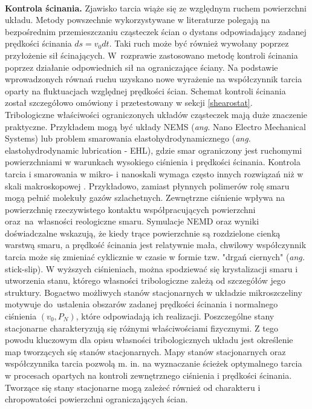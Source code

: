 \documentclass[12pt,a4paper,openright]{report} %
\begin{document}
\\
\textbf{Kontrola ścinania.} Zjawisko tarcia wiąże się ze względnym ruchem powierzchni układu. Metody powszechnie wykorzystywane w literaturze polegają na bezpośrednim przemieszczaniu cząsteczek ścian o dystans odpowiadający zadanej prędkości ścinania \linebreak $ds=v_0dt$. Taki ruch może być również wywołany poprzez przyłożenie sił ścinających. W~rozprawie zastosowano metodę kontroli ścinania poprzez działanie odpowiednich sił na ograniczające ściany. Na podstawie wprowadzonych równań ruchu uzyskano nowe wyrażenie na współczynnik tarcia oparty na fluktuacjach względnej prędkości ścian. Schemat kontroli ścinania został szczegółowo omówiony i przetestowany w sekcji \ref{shearostat}.\\
%
%

Tribologiczne właściwości ograniczonych układów cząsteczek mają duże znaczenie praktyczne. Przykładem mogą być układy NEMS (\textit{ang.} Nano Electro Mechanical Systems) lub problem smarowania elastohydrodynamicznego (\textit{ang.} elastohydrodynamic lubrication - EHL), gdzie smar ograniczony jest ruchomymi powierzchniami w warunkach wysokiego ciśnienia i prędkości ścinania. Kontrola tarcia i smarowania w mikro- i nanoskali wymaga często innych rozwiązań niż w skali makroskopowej \cite{SpringerHandbook}. Przykładowo, zamiast płynnych polimerów rolę smaru mogą pełnić molekuły gazów szlachetnych. Zewnętrzne ciśnienie wpływa na powierzchnię rzeczywistego kontaktu współpracujących powierzchni oraz~na~własności reologiczne smaru. Symulacje NEMD oraz wyniki doświadczalne wskazują, że kiedy trące powierzchnie są rozdzielone cienką warstwą smaru, a prędkość ścinania jest relatywnie mała, chwilowy współczynnik tarcia może się zmieniać cyklicznie w czasie w formie tzw. "drgań ciernych" (\textit{ang.} stick-slip). W wyższych ciśnieniach, można spodziewać się krystalizacji smaru i utworzenia stanu, którego własności tribologiczne zależą od szczegółów jego struktury. 
%
\newpage
Bogactwo możliwych stanów stacjonarnych w układzie mikroszczeliny motywuje \linebreak do~ustalenia obszarów zadanej prędkości ścinania i normalnego ciśnienia $(v_0, P_N)$, które odpowiadają ich realizacji. Poszczególne stany stacjonarne charakteryzują się różnymi właściwościami fizycznymi. Z tego powodu kluczowym dla opisu własności tribologicznych układu jest określenie map tworzących się stanów stacjonarnych. Mapy stanów stacjonarnych oraz współczynnika tarcia pozwolą m. in. na wyznaczanie ścieżek optymalnego tarcia w procesach opartych na kontroli zewnętrznego ciśnienia i prędkości ścinania. Tworzące się stany stacjonarne mogą zależeć również od charakteru i chropowatości powierzchni ograniczających ścian. 
\end{document}
